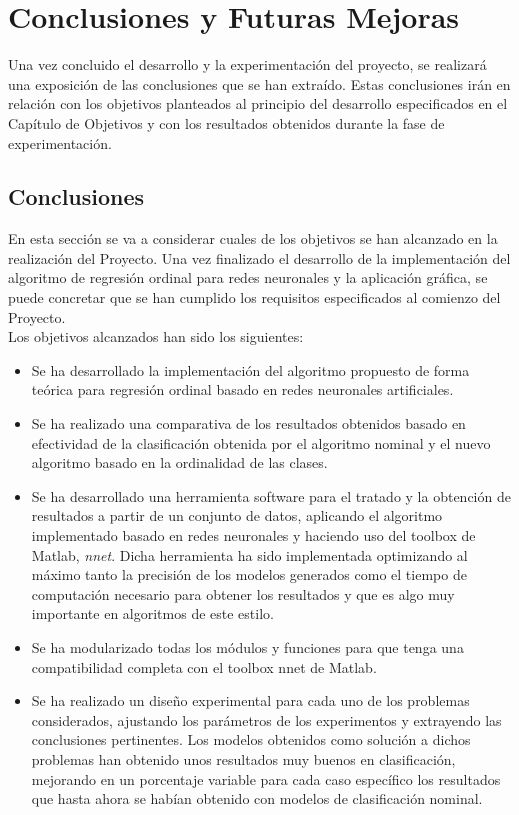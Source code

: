 \chapter{Conclusiones y Futuras Mejoras}
	
	Una vez concluido el desarrollo y la experimentación del proyecto, se realizará una exposición de las conclusiones que se han extraído. Estas conclusiones irán en relación con los objetivos planteados al principio del desarrollo especificados en el Capítulo de Objetivos y con los resultados obtenidos durante la fase de experimentación.
	
	\section{Conclusiones}
		
		En esta sección se va a considerar cuales de los objetivos se han alcanzado en la realización del Proyecto. Una vez finalizado el desarrollo de la implementación del algoritmo de regresión ordinal para redes neuronales y la aplicación gráfica, se puede concretar que se han cumplido los requisitos especificados al comienzo del Proyecto.\\
		
		Los objetivos alcanzados han sido los siguientes:
		
		\begin{itemize}
			\item Se ha desarrollado la implementación del algoritmo propuesto de forma teórica para regresión ordinal basado en redes neuronales artificiales.
			\item Se ha realizado una comparativa de los resultados obtenidos basado en efectividad de la clasificación obtenida por el algoritmo nominal y el nuevo algoritmo basado en la ordinalidad de las clases.
			\item Se ha desarrollado una herramienta software para el tratado y la obtención de resultados a partir de un conjunto de datos, aplicando el algoritmo implementado basado en redes neuronales y haciendo uso del toolbox de Matlab, \textit{nnet}. Dicha herramienta ha sido implementada optimizando al máximo tanto la precisión de los modelos generados como el tiempo de computación necesario para obtener los resultados y que es algo muy importante en algoritmos de este estilo.
			\item Se ha modularizado todas los módulos y funciones para que tenga una compatibilidad completa con el toolbox nnet de Matlab.
			\item Se ha realizado un diseño experimental para cada uno de los problemas considerados, ajustando los parámetros de los experimentos y extrayendo las conclusiones pertinentes. Los modelos obtenidos como solución a dichos problemas han obtenido unos resultados muy buenos en clasificación, mejorando en un porcentaje variable para cada caso específico los resultados que hasta ahora se habían obtenido con modelos de clasificación nominal.
		\end{itemize}
		
